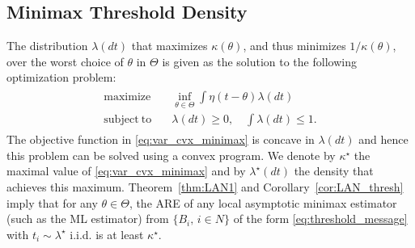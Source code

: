 \subsection{Minimax Threshold Density}
The distribution $\lambda(dt)$ that maximizes $\kappa(\theta)$, and thus minimizes $1/\kappa(\theta)$, over the worst choice of $\theta$ in $\Theta$ is given as the solution to the following optimization problem:
\begin{align}
\label{eq:var_cvx_minimax}
\begin{split}
\mathrm{maximize} \quad &  \inf_{\theta \in \Theta} \int \eta(t-\theta) \lambda(dt)
\\ 
\mathrm{subject~to} 
\quad & \lambda(dt)\geq 0,\quad \int \lambda(dt) \leq 1. 
\end{split}
\end{align}
The objective function in \eqref{eq:var_cvx_minimax} is concave in $\lambda(dt)$ and hence this problem can be solved using a convex program. We denote by $\kappa^\star$ the maximal value of \eqref{eq:var_cvx_minimax} and by $\lambda^\star(dt)$ the density that achieves this maximum. Theorem~\ref{thm:LAN1} and Corollary~\ref{cor:LAN_thresh} imply that for any $\theta \in \Theta$, the ARE of any local asymptotic minimax estimator (such as the ML estimator) from $\{B_i,\,i\in N\}$ of the form \eqref{eq:threshold_message} with $t_i \sim \lambda^\star$ i.i.d. is at least $\kappa^\star$.
%
